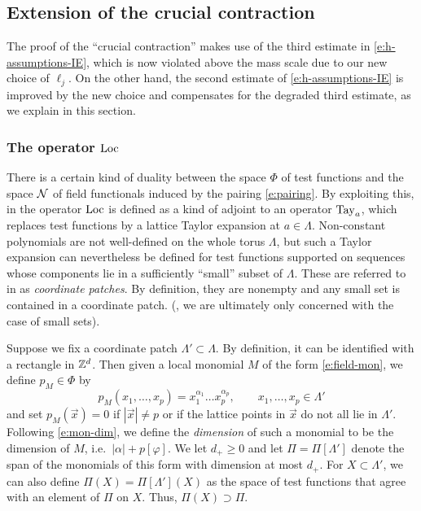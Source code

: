 
\subsection{Extension of the crucial contraction}
\label{sec:cc}

The proof of the ``crucial contraction''
\cite[Proposition \ref{IE-prop:cl}]{BS-rg-IE}
makes use of the  third estimate in
\eqref{e:h-assumptions-IE}, which is now violated above the mass scale
due to our new choice of $\ell_j$.
On the other hand, the second estimate of \eqref{e:h-assumptions-IE} is
improved by the new choice and compensates for the degraded third estimate,
as we explain in this section.

\subsubsection{The operator $\operatorname{Loc}$}

There is a certain kind of duality between the space $\Phi$ of test functions
and the space $\mathcal{N}$ of field functionals induced by the pairing \eqref{e:pairing}.
By exploiting this,
in \cite{BS-rg-IE} the operator $\operatorname{Loc}$ is defined as a kind of adjoint to
an operator ${\rm Tay}_a$, which replaces test functions by a lattice Taylor expansion
at $a\in\Lambda$.
Non-constant polynomials are not well-defined on the whole torus $\Lambda$, but
such a Taylor expansion can nevertheless be defined for test functions supported
on sequences whose components lie in a sufficiently ``small'' subset of $\Lambda$.
These are referred to in \cite{BS-rg-IE} as \emph{coordinate patches}. By definition,
they are nonempty and any small set is contained in a coordinate patch.
(, we are ultimately only concerned with the case of small sets).


Suppose we fix a coordinate patch $\Lambda' \subset \Lambda$. By definition, it
can be identified with a rectangle in ${ {{\mathbb Z}}^d }$.
Then given a local monomial $M$ of the form \eqref{e:field-mon},
we define $p_M\in\Phi$ by
\begin{equation}
\label{e:lattice-mon}
p_M(x_1, \ldots, x_p)
	=
x_1^{\alpha_1} \ldots x_p^{\alpha_p},
	\qquad
x_1, \ldots, x_p \in \Lambda'
\end{equation}
and set $p_M(\vec x) = 0$ if $|\vec x| \ne p$ or if the lattice points in $\vec x$
do not all lie in $\Lambda'$. Following \eqref{e:mon-dim},
we define the \emph{dimension} of such a monomial to be the dimension of $M$,
i.e.\ $|\alpha| + p [\varphi]$.
We let $d_+ \ge 0$ and let $\Pi = \Pi[\Lambda']$ denote the span of the monomials
of this form with dimension at most $d_+$. For $X \subset \Lambda'$, we can also define
$\Pi(X) = \Pi[\Lambda'](X)$ as the space of test functions that agree with an element
of $\Pi$ on $X$. Thus, $\Pi(X) \supset \Pi$.

